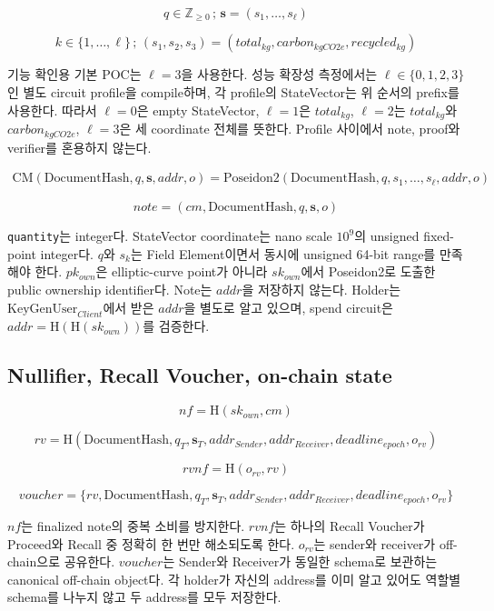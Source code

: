 \documentclass[11pt,a4paper]{extarticle}
\newcommand{\CM}{\mathrm{CM}}
\newcommand{\Poseidon}{\mathrm{Poseidon2}}
\newcommand{\Hash}{\mathrm{H}}
\newcommand{\DocumentHash}{\mathrm{DocumentHash}}
\newcommand{\addrSender}{addr_{Sender}}
\newcommand{\addrReceiver}{addr_{Receiver}}
\begin{document}
\[
  q\in\mathbb{Z}_{\geq0}
  \,;\,
  \mathbf{s}=(s_1,\ldots,s_{\ell})
\]

\[
  k\in\{1,\ldots,\ell\}
  \,;\,
  (s_1,s_2,s_3)=(total_{kg},carbon_{kgCO2e},recycled_{kg})
\]

기능 확인용 기본 POC는 $\ell=3$을 사용한다. 성능 확장성 측정에서는
$\ell\in\{0,1,2,3\}$인 별도 circuit profile을 compile하며, 각 profile의 StateVector는
위 순서의 prefix를 사용한다. 따라서 $\ell=0$은 empty StateVector, $\ell=1$은
$total_{kg}$, $\ell=2$는 $total_{kg}$와 $carbon_{kgCO2e}$, $\ell=3$은 세 coordinate
전체를 뜻한다. Profile 사이에서 note, proof와 verifier를 혼용하지 않는다.

\[
  \begin{aligned}
  \CM(\DocumentHash,q,\mathbf{s},addr,o)
  =\Poseidon(\DocumentHash,q,s_1,\ldots,s_{\ell},addr,o)
  \end{aligned}
\]

\[
  \mathit{note}=(cm,\DocumentHash,q,\mathbf{s},o)
\]

\texttt{quantity}는 integer다. StateVector coordinate는 nano scale $10^9$의
unsigned fixed-point integer다. $q$와 $s_k$는 Field Element이면서 동시에
unsigned 64-bit range를 만족해야 한다. $pk_{own}$은 elliptic-curve point가 아니라
$sk_{own}$에서 Poseidon2로 도출한 public ownership identifier다. Note는 $addr$을
저장하지 않는다. Holder는
$\mathrm{KeyGenUser}_{Client}$에서 받은 $addr$을 별도로 알고 있으며, spend circuit은
$addr=\Hash(\Hash(sk_{own}))$를 검증한다.

\subsection{Nullifier, Recall Voucher, on-chain state}

\[
  nf=\Hash(sk_{own},cm)
\]

\[
  rv=
  \Hash(
    \DocumentHash,q_T,\mathbf{s}_T,
    \addrSender,\addrReceiver,deadline_{epoch},o_{rv}
  )
\]

\[
  rvnf=\Hash(o_{rv},rv)
\]

\[
  \mathit{voucher}=\{
    rv,\DocumentHash,q_T,\mathbf{s}_T,
    \addrSender,\addrReceiver,deadline_{epoch},o_{rv}
  \}
\]

$nf$는 finalized note의 중복 소비를 방지한다. $rvnf$는 하나의 Recall Voucher가
Proceed와 Recall 중 정확히 한 번만 해소되도록 한다. $o_{rv}$는 sender와 receiver가
off-chain으로 공유한다. $\mathit{voucher}$는 Sender와 Receiver가 동일한 schema로
보관하는 canonical off-chain object다. 각 holder가 자신의 address를 이미 알고 있어도
역할별 schema를 나누지 않고 두 address를 모두 저장한다.
\end{document}
